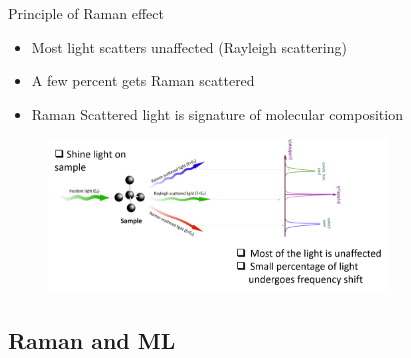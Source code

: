 \begin{frame}{Principle of Raman effect}

\begin{itemize}
   \item Most light scatters unaffected (Rayleigh scattering)
	\item A few percent gets Raman scattered
	\item Raman Scattered light is signature of molecular composition
\end{itemize}

	\begin{figure}
		
		\includegraphics[width=9.0cm]{figures/raman_principle3.png}
	\end{figure}


\end{frame}

\subsection{Raman and ML} %

